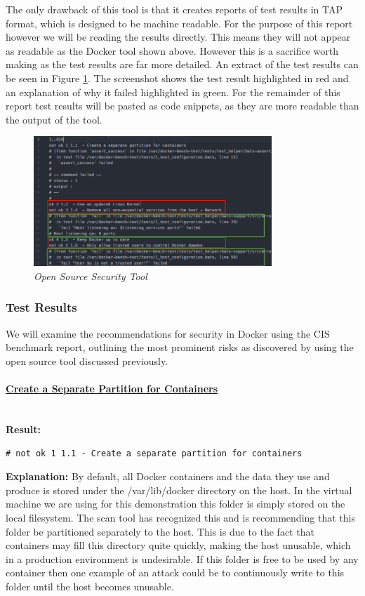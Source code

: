 \documentclass{article}
\begin{document}
The only drawback of this tool is that it creates reports of test results in TAP format, which is designed to be machine readable. For the purpose of this report however we will be reading the results directly. This means they will not appear as readable as the Docker tool shown above. However this is a sacrifice worth making as the test results are far more detailed. An extract of the test results can be seen in Figure \ref{fig:sec_tool}. The screenshot shows the test result highlighted in red and an explanation of why it failed highlighted in green. For the remainder of this report test results will be pasted as code snippets, as they are more readable than the output of the tool.

\begin{figure}[!h]
\centering
\includegraphics*[width=0.8\textwidth]{components/images/open-source-results}
\caption{\em Open Source Security Tool}
\label{fig:sec_tool}
\end{figure}

\newpage
\subsubsection{Test Results}
\label{subs:results}
We will examine the recommendations for security in Docker using the CIS benchmark report, outlining the most prominent risks as discovered by using the open source tool discussed previously. 


\paragraph{\underline{Create a Separate Partition for Containers}}\mbox{}\\

\textbf{Result:} 

\texttt{\# not ok 1 1.1  - Create a separate partition for containers}

\textbf{Explanation:} By default, all Docker containers and the data they use and produce is stored under the /var/lib/docker directory on the host. In the virtual machine we are using for this demonstration this folder is simply stored on the local filesystem. The scan tool has recognized this and is recommending that this folder be partitioned separately to the host. This is due to the fact that containers may fill this directory quite quickly, making the host unusable, which in a production environment is undesirable. If this folder is free to be used by any container then one example of an attack could be to continuously write to this folder until the host becomes unusable.
\end{document}
